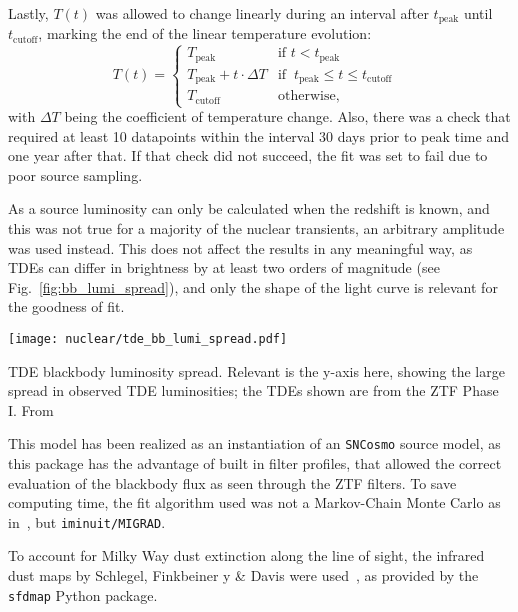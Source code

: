 Lastly, $T(t)$ was allowed to change linearly during an interval after $t_\text{peak}$ until $t_\text{cutoff}$, marking the end of the linear temperature evolution:
\begin{equation}
    T(t) = \begin{cases}
        T_\text{peak}                    & \text{if $t<t_\text{peak}$}                              \\
        T_\text{peak} + t \cdot \Delta T & \text{if $~t_\text{peak} \leq t \leq t_\text{cutoff} $ } \\
        T_\text{cutoff}                  & \text{otherwise},
    \end{cases}
\end{equation}
with $\Delta T$ being the coefficient of temperature change. Also, there was a check that required at least 10 datapoints within the interval 30 days prior to peak time and one year after that. If that check did not succeed, the fit was set to fail due to poor source sampling.

As a source luminosity can only be calculated when the redshift is known, and this was not true for a majority of the nuclear transients, an arbitrary amplitude was used instead. This does not affect the results in any meaningful way, as TDEs can differ in brightness by at least two orders of magnitude (see Fig.~\ref{fig:bb_lumi_spread}), and only the shape of the light curve is relevant for the goodness of fit.\cite{Hammerstein2022}

\begin{marginfigure}
    \texttt{[image: nuclear/tde\_bb\_lumi\_spread.pdf]}
    \caption[TDE Blackbody luminosity spread]{TDE blackbody luminosity spread. Relevant is the y-axis here, showing the large spread in observed TDE luminosities; the TDEs shown are from the ZTF Phase I. From~\cite{Hammerstein2022}}
\end{marginfigure}

This model has been realized as an instantiation of an \texttt{SNCosmo} source model, as this package has the advantage of built in filter profiles, that allowed the correct evaluation of the blackbody flux as seen through the ZTF filters. To save computing time, the fit algorithm used was not a Markov-Chain Monte Carlo as in~\cite{Velzen2021a}, but \texttt{iminuit/MIGRAD}.

To account for Milky Way dust extinction along the line of sight, the infrared dust maps by Schlegel, Finkbeiner y \& Davis were used~, as provided by the \texttt{sfdmap} Python package.


